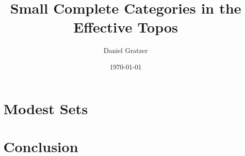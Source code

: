 \documentclass[12pt]{amsart}
\title{Small Complete Categories in the Effective Topos}
\author{Daniel Gratzer}
\date{\today}
\begin{document}
\maketitle







\section{Modest Sets}\label{sec:modest}
\section{Conclusion}\label{sec:conclusion}


{}
\end{document}
